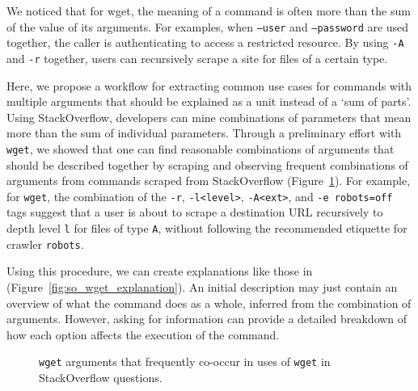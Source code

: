 We noticed that for wget, the meaning of a command is often more than the sum of the value of its arguments.
For examples, when \texttt{--user} and \texttt{--password} are used together, the caller is authenticating to access a restricted resource.
By using \texttt{-A} and \texttt{-r} together, users can recursively scrape a site for files of a certain type.

Here, we propose a workflow for extracting common use cases for commands with multiple arguments that should be explained as a unit instead of a `sum of parts'.
Using StackOverflow, developers can mine combinations of parameters that mean more than the sum of individual parameters.
Through a preliminary effort with \texttt{wget}, we showed that one can find reasonable combinations of arguments that should be described together by scraping and observing frequent combinations of arguments from commands scraped from StackOverflow (Figure~\ref{fig:wget_arguments}).
For example, for \texttt{wget}, the combination of the \texttt{-r}, \texttt{-l<level>}, \texttt{-A<ext>}, and \texttt{-e robots=off} tags suggest that a user is about to scrape a destination URL recursively to depth level \texttt{l} for files of type \texttt{A}, without following the recommended etiquette for crawler \texttt{robots}.

Using this procedure, we can create explanations like those in (Figure~\ref{fig:so_wget_explanation}).
An initial description may just contain an overview of what the command does as a whole, inferred from the combination of arguments.
However, asking for information can provide a detailed breakdown of how each option affects the execution of the command.

\begin{figure}
\caption{\texttt{wget} arguments that frequently co-occur in uses of \texttt{wget} in StackOverflow questions. }
\label{fig:wget_arguments}
\end{figure}

